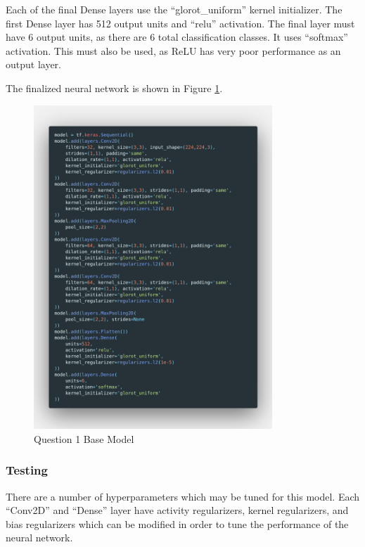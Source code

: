 Each of the final Dense layers use the ``glorot\_uniform'' kernel initializer.
The first Dense layer has 512 output units and ``relu'' activation. The final
layer must have 6 output units, as there are 6 total classification classes. It
uses ``softmax'' activation. This must also be used, as ReLU has very poor
performance as an output layer.

The finalized neural network is shown in Figure \ref{fig:q1Model}.

\begin{figure}[H]
	\centering
	\includegraphics[width=0.8\textwidth]{images/Code/model}
	\caption{Question 1 Base Model}
	\label{fig:q1Model}
\end{figure}

\subsubsection{Testing}

There are a number of hyperparameters which may be tuned for this model. Each
``Conv2D'' and ``Dense'' layer have activity regularizers, kernel regularizers,
and bias regularizers which can be modified in order to tune the performance of
the neural network.

